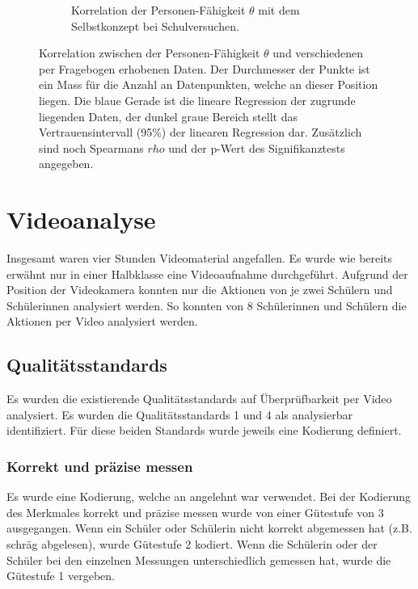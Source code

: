 \begin{figure}[htbp]
\begin{subfigure}{0.49\textwidth}
    \caption{Korrelation der Personen-Fähigkeit $\theta$ mit dem Selbstkonzept bei Schulversuchen.}
    \label{fig:corPersonenSelbskonzept}
  \end{subfigure}
 \caption{Korrelation zwischen der Personen-Fähigkeit $\theta$ und verschiedenen per Fragebogen erhobenen Daten. Der Durchmesser der Punkte ist ein Mass für die Anzahl an Datenpunkten, welche an dieser Position liegen. Die blaue Gerade ist die lineare Regression der zugrunde liegenden Daten, der dunkel graue Bereich stellt das Vertrauensintervall (95\%) der linearen Regression dar. Zusätzlich sind noch Spearmans $rho$ und der p-Wert des Signifikanztests angegeben.}
 \label{fig:corPersonen}
 \end{figure}
 
 
 \section{Videoanalyse}
 
 Insgesamt waren vier Stunden Videomaterial angefallen. Es wurde wie bereits erwähnt nur in einer Halbklasse eine Videoaufnahme durchgeführt. Aufgrund der Position der Videokamera konnten nur die Aktionen von je zwei Schülern und Schülerinnen analysiert werden. So konnten von 8 Schülerinnen und Schülern die Aktionen per Video analysiert werden.
 
 \subsection{Qualitätsstandards}
 
 Es wurden die existierende Qualitätsstandards auf Überprüfbarkeit per Video analysiert. Es wurden die Qualitätsstandards 1 und 4 als analysierbar identifiziert. Für diese beiden Standards wurde jeweils eine Kodierung definiert.
 
 \subsubsection{Korrekt und präzise messen}
 
 Es wurde eine Kodierung, welche an \citet{Schreiber2012} angelehnt war verwendet. Bei der Kodierung des Merkmales korrekt und präzise messen wurde von einer Gütestufe von 3 ausgegangen. Wenn ein Schüler oder Schülerin nicht korrekt abgemessen hat (z.B. schräg abgelesen), wurde Gütestufe 2 kodiert. Wenn die Schülerin oder der Schüler bei den einzelnen Messungen unterschiedlich gemessen hat, wurde die Gütestufe 1 vergeben.
 
